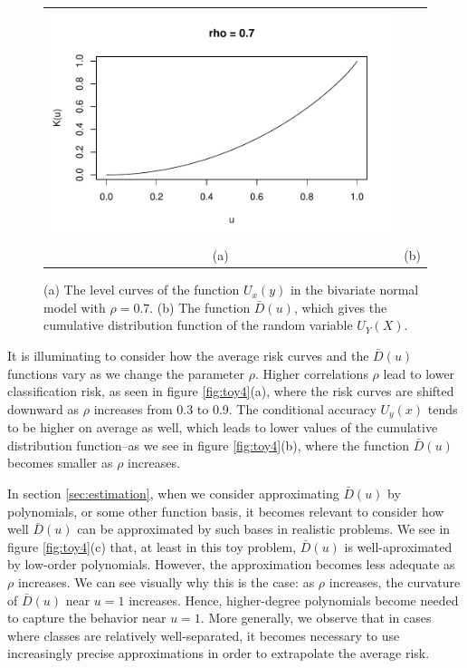 \documentclass[12pt]{article}
\begin{document}
\begin{figure}[h]
\begin{tabular}{cc}
\includegraphics[scale = 0.65, clip = true, trim = 0 -0.3in 0 0.5in]{illus_kfunc_0_7.pdf}\\
(a) & (b)
\end{tabular}

\caption{
(a) The level curves of the function $U_x(y)$ in the bivariate normal model with $\rho = 0.7$.
(b) The function $\bar{D}(u)$, which gives the cumulative distribution function of the random variable $U_Y(X)$.}\label{fig:toy3}
\end{figure}

It is illuminating to consider how the average risk curves and the
$\bar{D}(u)$ functions vary as we change the parameter $\rho$.  Higher
correlations $\rho$ lead to lower classification risk, as seen in
figure \ref{fig:toy4}(a), where the risk curves are shifted downward as
$\rho$ increases from 0.3 to 0.9.  The conditional accuracy $U_y(x)$
tends to be higher on average as well, which leads to lower values of
the cumulative distribution function--as we see in
figure \ref{fig:toy4}(b), where the function $\bar{D}(u)$ becomes smaller
as $\rho$ increases.

In section \ref{sec:estimation}, when we consider approximating
$\bar{D}(u)$ by polynomials, or some other function basis, it becomes
relevant to consider how well $\bar{D}(u)$ can be approximated by such
bases in realistic problems.  We see in figure \ref{fig:toy4}(c) that,
at least in this toy problem, $\bar{D}(u)$ is well-aproximated by
low-order polynomials.  However, the approximation becomes less
adequate as $\rho$ increases.  We can see visually why this is the
case: as $\rho$ increases, the curvature of $\bar{D}(u)$ near $u = 1$
increases.  Hence, higher-degree polynomials become needed to capture
the behavior near $u = 1$.  More generally, we observe that in cases
where classes are relatively well-separated, it becomes necessary to
use increasingly precise approximations in order to extrapolate the
average risk.
\end{document}

